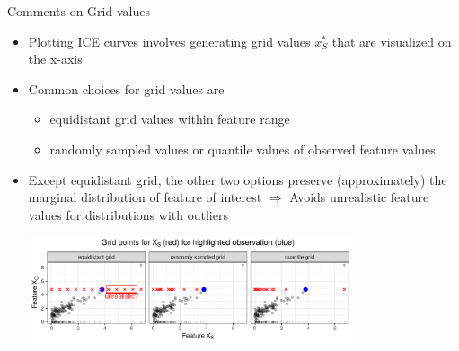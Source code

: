 \documentclass[11pt,compress,t,notes=noshow, aspectratio=169, xcolor=table]{beamer}
\begin{document}
\begin{frame}{Comments on Grid values}
\begin{itemize}
\item Plotting ICE curves involves generating grid values $x_S^*$ that are visualized on the x-axis
\item Common choices for grid values are
\begin{itemize}
\item equidistant grid values within feature range
\item randomly sampled values or quantile values of observed feature values
\end{itemize}
\item Except equidistant grid, the other two options preserve (approximately) the marginal distribution of feature of interest
$\Rightarrow$ Avoids unrealistic feature values for distributions with outliers %

\vspace{3pt}
\centering
\includegraphics[width=0.75\textwidth, trim=0cm 0cm 0cm 0cm, clip]{figure/sampling}

\end{itemize}
\end{frame}

\endlecture
\end{document}
